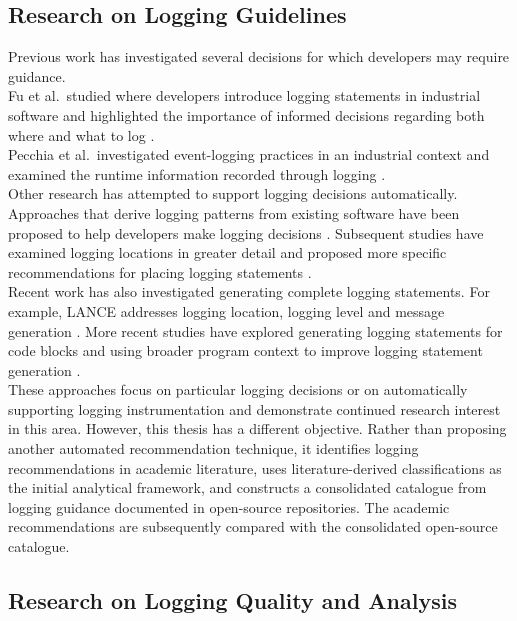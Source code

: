 \subsection{Research on Logging Guidelines}

Previous work has investigated several decisions for which developers may require guidance.
\\
Fu et al.\ studied where developers introduce logging statements in industrial software 
and highlighted the importance of informed decisions regarding both where and what to log \cite{fu2014wheredodeveloperslog}.
\\
Pecchia et al.\ investigated event-logging practices in an industrial context 
and examined the runtime information recorded through logging \cite{peccia2015industrypracticesandeventlogging}.
\\
Other research has attempted to support logging decisions automatically.
Approaches that derive logging patterns from existing software have been proposed to help
developers make logging decisions \cite{zhu2015learningtolog}. 
Subsequent studies have examined logging locations in greater detail and proposed more specific
recommendations for placing logging statements \cite{li2021whereshallwelog}.
\\
Recent work has also investigated generating complete logging statements. 
For example, LANCE addresses logging location, logging level and message generation \cite{mastropaolo2022usingdeeplearning}. 
More recent studies have explored generating logging statements for code blocks \cite{fu2024endtoendlogstatement} 
and using broader program context to improve logging statement generation \cite{li2024gostatic}.
\\
These approaches focus on particular logging decisions or on automatically supporting logging instrumentation and demonstrate continued research interest in this area. 
However, this thesis has a different objective. Rather than proposing another automated recommendation technique, 
it identifies logging recommendations in academic literature, uses literature-derived classifications as the initial analytical framework, 
and constructs a consolidated catalogue from logging guidance documented in open-source repositories. 
The academic recommendations are subsequently compared with the consolidated open-source catalogue.

\subsection{Research on Logging Quality and Analysis}

